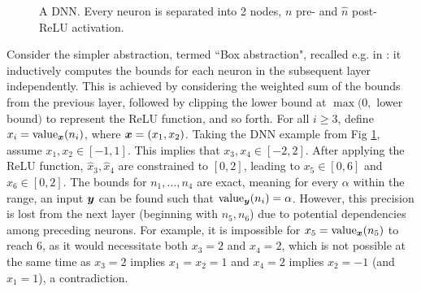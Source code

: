 \begin{figure}[t!]
	\caption{A DNN. Every neuron is separated into 2 nodes, 
	$n$ pre- and $\hat{n}$ post-ReLU activation.} 
	\label{fig1}
\end{figure}




Consider the simpler abstraction, termed ``Box abstraction", {\color{blue} recalled e.g. in \cite{deeppoly}}: it inductively computes the bounds for each neuron in the subsequent layer independently. This is achieved by considering the weighted sum of the bounds from the previous layer, followed by clipping the lower bound at $\max(0,$ lower bound$)$ to represent the ReLU function, and so forth. 
For all $i \geq 3$, define $x_i={\textrm{value}}_{{\bm{x}}}(n_i)$, where ${\bm{x}}=(x_1,x_2)$.
Taking the DNN example from Fig \ref{fig1}, assume $x_1,x_2 \in [-1,1]$. This implies that $x_3,x_4 \in [-2,2]$. After applying the ReLU function, $\hat{x}_3,\hat{x}_4$ are constrained to $[0,2]$, leading to $x_5 \in [0,6]$ and $x_6 \in [0,2]$. 
The bounds for $n_1, \ldots, n_4$ are exact, meaning for every $\alpha$ within the range, an input ${\bm{y}}$ can be found such that ${\textrm{value}}_{{\bm{y}}}(n_i)=\alpha$. However, this precision is lost from the next layer (beginning with $n_5, n_6$) due to potential dependencies among preceding neurons. For example, it is impossible for $x_5={\textrm{value}}_{{\bm{x}}}(n_5)$ to reach $6$, as it would necessitate both $x_3=2$ and $x_4=2$, which is not possible at the same time as 
$x_3=2$ implies $x_1=x_2=1$ and $x_4=2$ implies $x_2=-1$ (and $x_1=1$), a contradiction.


